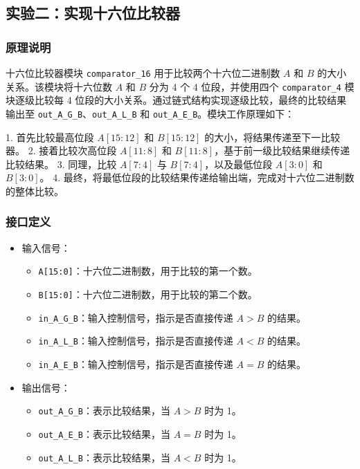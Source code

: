 \documentclass[zihao=5, UTF8]{article}
\theoremstyle{MyLineTheoremStyle} %
\theoremstyle{MyBlockTheoremStyle} %
\theoremstyle{MySubsubsectionStyle} %
\begin{document}
\subsection{实验二：实现十六位比较器}
\subsubsection{原理说明}
十六位比较器模块 \texttt{comparator\_16} 用于比较两个十六位二进制数 $A$ 和 $B$ 的大小关系。该模块将十六位数 $A$ 和 $B$ 分为 4 个 4 位段，并使用四个 \texttt{comparator\_4} 模块逐级比较每 4 位段的大小关系。通过链式结构实现逐级比较，最终的比较结果输出至 \texttt{out\_A\_G\_B}、\texttt{out\_A\_L\_B} 和 \texttt{out\_A\_E\_B}。模块工作原理如下：

1. 首先比较最高位段 $A[15:12]$ 和 $B[15:12]$ 的大小，将结果传递至下一比较器。
2. 接着比较次高位段 $A[11:8]$ 和 $B[11:8]$，基于前一级比较结果继续传递比较结果。
3. 同理，比较 $A[7:4]$ 与 $B[7:4]$，以及最低位段 $A[3:0]$ 和 $B[3:0]$。
4. 最终，将最低位段的比较结果传递给输出端，完成对十六位二进制数的整体比较。

\subsubsection{接口定义}
\begin{itemize}
    \item 输入信号：
    \begin{itemize}
        \item \texttt{A[15:0]}：十六位二进制数，用于比较的第一个数。
        \item \texttt{B[15:0]}：十六位二进制数，用于比较的第二个数。
        \item \texttt{in\_A\_G\_B}：输入控制信号，指示是否直接传递 $A > B$ 的结果。
        \item \texttt{in\_A\_L\_B}：输入控制信号，指示是否直接传递 $A < B$ 的结果。
        \item \texttt{in\_A\_E\_B}：输入控制信号，指示是否直接传递 $A = B$ 的结果。
    \end{itemize}
    \item 输出信号：
    \begin{itemize}
        \item \texttt{out\_A\_G\_B}：表示比较结果，当 $A > B$ 时为 1。
        \item \texttt{out\_A\_E\_B}：表示比较结果，当 $A = B$ 时为 1。
        \item \texttt{out\_A\_L\_B}：表示比较结果，当 $A < B$ 时为 1。
    \end{itemize}
\end{itemize}
\end{document}
